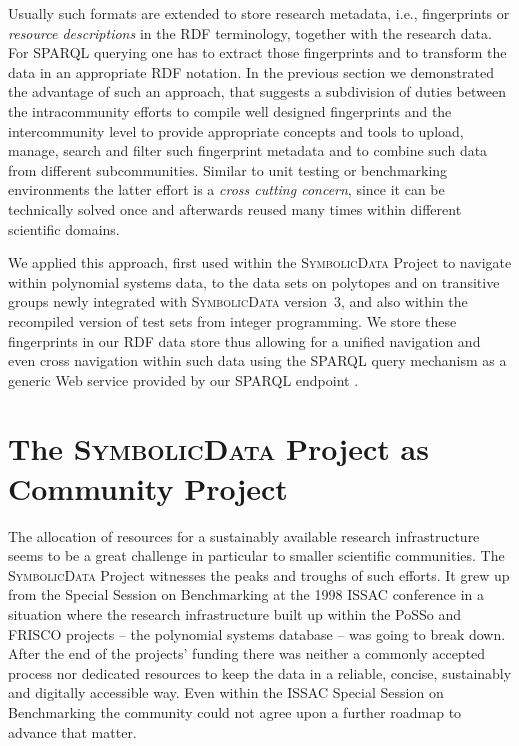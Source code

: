 \documentclass{mathincs}
\newcommand{\SD}{\textsc{Symbo\-lic\-Data}}
\begin{document}
Usually such formats are extended to store research metadata, i.e.,
fingerprints or \emph{resource descriptions} in the RDF terminology, together
with the research data.  For SPARQL querying one has to extract those
fingerprints and to transform the data in an appropriate RDF notation. In the
previous section we demonstrated the advantage of such an approach, that
suggests a subdivision of duties between the intracommunity efforts to compile
well designed fingerprints and the intercommunity level to provide appropriate
concepts and tools to upload, manage, search and filter such fingerprint
metadata and to combine such data from different subcommunities.  Similar to
unit testing or benchmarking environments the latter effort is a \emph{cross
  cutting concern}, since it can be technically solved once and afterwards
reused many times within different scientific domains. 

We applied this approach, first used within the {\SD} Project to navigate
within polynomial systems data, to the data sets on polytopes and on transitive
groups newly integrated with {\SD} version~3, and also within the recompiled
version of test sets from integer programming.  We store these fingerprints in
our RDF data store \cite{sdstore} thus allowing for a unified navigation and
even cross navigation within such data using the SPARQL query mechanism as a
generic Web service provided by our SPARQL endpoint \cite{sdsparql}.  

\section{The {\SD} Project as Community Project}

The allocation of resources for a sustainably available research infrastructure
seems to be a great challenge in particular to smaller scientific communities.
The {\SD} Project witnesses the peaks and troughs of such efforts. It grew up
from the Special Session on Benchmarking at the 1998 ISSAC conference in a
situation where the research infrastructure built up within the PoSSo
\cite{PoSSo} and FRISCO \cite{FRISCO} projects -- the polynomial systems
database -- was going to break down. After the end of the projects' funding
there was neither a commonly accepted process nor dedicated resources to keep
the data in a reliable, concise, sustainably and digitally accessible way. Even
within the ISSAC Special Session on Benchmarking the community could not agree
upon a further roadmap to advance that matter.
\end{document}
